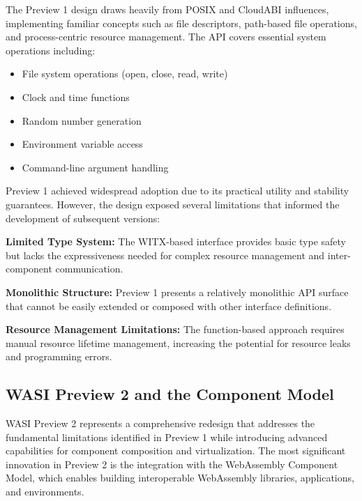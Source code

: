 
The Preview 1 design draws heavily from POSIX and CloudABI influences, implementing familiar concepts such as file descriptors, path-based file operations, and process-centric resource management. The API covers essential system operations including:

\begin{itemize}
    \item File system operations (open, close, read, write)
    \item Clock and time functions
    \item Random number generation
    \item Environment variable access
    \item Command-line argument handling
\end{itemize}

Preview 1 achieved widespread adoption due to its practical utility and stability guarantees. However, the design exposed several limitations that informed the development of subsequent versions:

\textbf{Limited Type System:} The WITX-based interface provides basic type safety but lacks the expressiveness needed for complex resource management and inter-component communication.

\textbf{Monolithic Structure:} Preview 1 presents a relatively monolithic API surface that cannot be easily extended or composed with other interface definitions.

\textbf{Resource Management Limitations:} The function-based approach requires manual resource lifetime management, increasing the potential for resource leaks and programming errors.

\subsection{WASI Preview 2 and the Component Model}
\label{subsec:wasi-preview2}

WASI Preview 2 represents a comprehensive redesign that addresses the fundamental limitations identified in Preview 1 while introducing advanced capabilities for component composition and virtualization\cite{wasi_component_model}. The most significant innovation in Preview 2 is the integration with the WebAssembly Component Model, which enables building interoperable WebAssembly libraries, applications, and environments.

